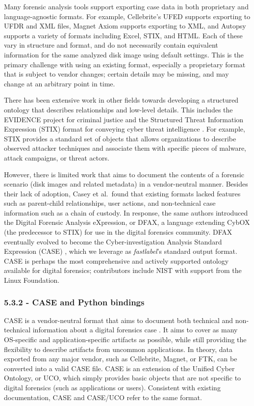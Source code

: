 Many forensic analysis tools support exporting case data in both
proprietary and language-agnostic formats. For example, Cellebrite's
UFED supports exporting to UFDR and XML files, Magnet Axiom supports
exporting to XML, and Autopsy supports a variety of formats including
Excel, STIX, and HTML. Each of these vary in structure and format, and
do not necessarily contain equivalent information for the same analyzed
disk image using default settings. This is the primary challenge with
using an existing format, especially a proprietary format that is
subject to vendor changes; certain details may be missing, and may
change at an arbitrary point in time.

There has been extensive work in other fields towards developing a
structured ontology that describes relationships and low-level details.
This includes the EVIDENCE project for criminal justice and the
Structured Threat Information Expression (STIX) format for conveying
cyber threat intelligence
\cite{caseyLeveragingCybOXStandardize2015}. For example, STIX
provides a standard set of objects that allows organizations to describe
observed attacker techniques and associate them with specific pieces of
malware, attack campaigns, or threat actors.

However, there is limited work that aims to document the contents of a
forensic scenario (disk images and related metadata) in a vendor-neutral
manner. Besides their lack of adoption, Casey et al.~found that existing
formats lacked features such as parent-child relationships, user
actions, and non-technical case information such as a chain of custody.
In response, the same authors introduced the Digital Forensic Analysis
eXpression, or DFAX, a language extending CybOX (the predecessor to
STIX) for use in the digital forensics community. DFAX eventually
evolved to become the Cyber-investigation Analysis Standard Expression
(CASE) \cite{caseyAdvancingCoordinatedCyberinvestigations2017},
which we leverage as \emph{fastlabel}'s standard output format. CASE is
perhaps the most comprehensive and actively supported ontology available
for digital forensics; contributors include NIST with support from the
Linux Foundation.

\subsubsection{5.3.2 - CASE and Python
bindings}\label{case-and-python-bindings}

CASE is a vendor-neutral format that aims to document both technical and
non-technical information about a digital forensics case
\cite{caseyAdvancingCoordinatedCyberinvestigations2017}. It aims to
cover as many OS-specific and application-specific artifacts as
possible, while still providing the flexibility to describe artifacts
from uncommon applications. In theory, data exported from any major
vendor, such as Cellebrite, Magnet, or FTK, can be converted into a
valid CASE file. CASE is an extension of the Unified Cyber Ontology, or
UCO, which simply provides basic objects that are not specific to
digital forensics (such as applications or users). Consistent with
existing documentation, CASE and CASE/UCO refer to the same format.

